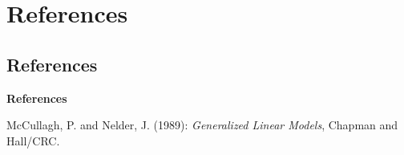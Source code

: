\documentclass[compress]{beamer}        %
\makeatletter
\newcommand{\tcb}{\textcolor{beamer@blendedblue}}
\makeatother
\begin{document}
\section[References]{References}
\subsection{References}
\begin{frame}{\bf \tcb{References}}
\begin{thebibliography}{99}
 McCullagh, P. and Nelder, J. (1989): \emph{Generalized Linear Models},
Chapman and Hall/CRC.
\end{thebibliography}
\end{frame}
\end{document}
